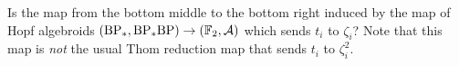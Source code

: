 \begin{qst} \label{cnj:73}
Is the map from the bottom middle to the bottom right induced by the map of Hopf algebroids $(\mathrm{BP}_*, \mathrm{BP}_*\mathrm{BP}) \to (\operatorname{\mathbb{F}}_2, \operatorname{\mathcal{A}})$ which sends $t_i$ to $\zeta_i$? Note that this map is \emph{not} the usual Thom reduction map that sends $t_i$ to $\zeta_i^2$.
\end{qst}



